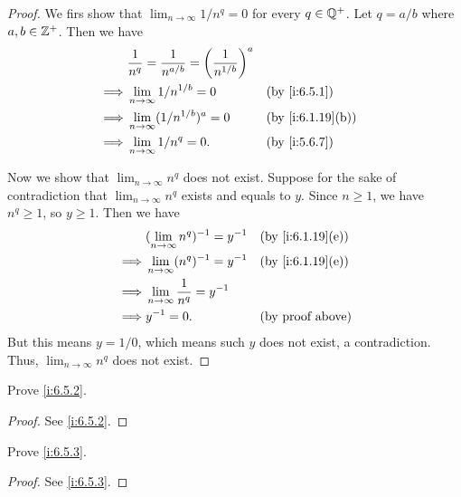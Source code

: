 \begin{proof}
  We firs show that \(\lim_{n \to \infty} 1 / n^q = 0\) for every \(q \in \mathbb{Q}^+\).
  Let \(q = a / b\) where \(a, b \in \mathbb{Z}^+\).
  Then we have
  \begin{align*}
             & \dfrac{1}{n^q} = \dfrac{1}{n^{a / b}} = \bigg(\dfrac{1}{n^{1 / b}}\bigg)^a                       \\
    \implies & \lim_{n \to \infty} 1 / n^{1 / b} = 0                                      &  & \by{i:6.5.1}     \\
    \implies & \lim_{n \to \infty} (1 / n^{1 / b})^a = 0                                  &  & \by{i:6.1.19}[b] \\
    \implies & \lim_{n \to \infty} 1 / n^q = 0.                                           &  & \by{i:5.6.7}
  \end{align*}

  Now we show that \(\lim_{n \to \infty} n^q\) does not exist.
  Suppose for the sake of contradiction that \(\lim_{n \to \infty} n^q\) exists and equals to \(y\).
  Since \(n \geq 1\), we have \(n^q \geq 1\), so \(y \geq 1\).
  Then we have
  \begin{align*}
             & (\lim_{n \to \infty} n^q)^{-1} = y^{-1}     &  & \by{i:6.1.19}[e]        \\
    \implies & \lim_{n \to \infty} (n^q)^{-1} = y^{-1}     &  & \by{i:6.1.19}[e]        \\
    \implies & \lim_{n \to \infty} \dfrac{1}{n^q} = y^{-1}                              \\
    \implies & y^{-1} = 0.                                 &  & \text{(by proof above)}
  \end{align*}
  But this means \(y = 1 / 0\), which means such \(y\) does not exist, a contradiction.
  Thus, \(\lim_{n \to \infty} n^q\) does not exist.
\end{proof}

\begin{ex}\label{i:ex:6.5.2}
  Prove \cref{i:6.5.2}.
\end{ex}

\begin{proof}
  See \cref{i:6.5.2}.
\end{proof}

\begin{ex}\label{i:ex:6.5.3}
  Prove \cref{i:6.5.3}.
\end{ex}

\begin{proof}
  See \cref{i:6.5.3}.
\end{proof}
